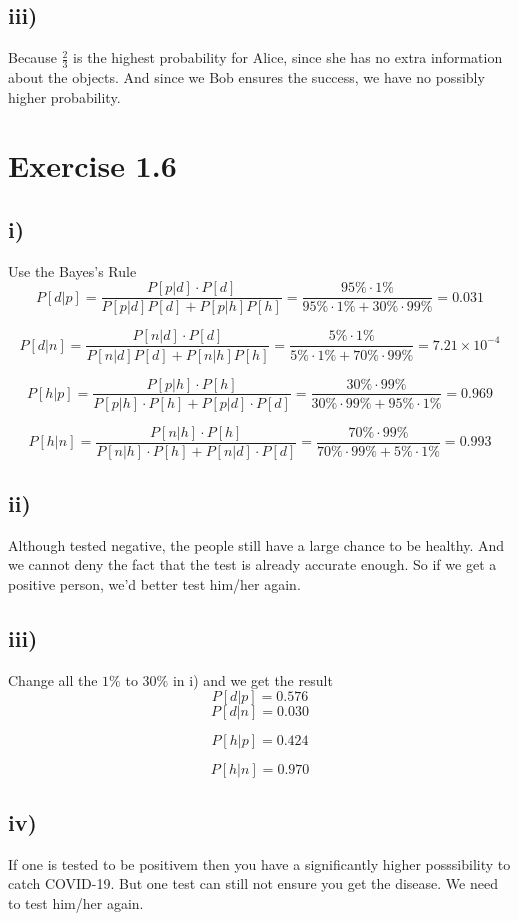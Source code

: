 \documentclass[12pt]{report}
\begin{document}
\subsection*{iii)}
Because $\frac{2}{3}$ is the highest probability for Alice, since she has no extra information about the objects. And since we Bob ensures the success, we have no possibly higher
probability.

\section*{Exercise 1.6}
\subsection*{i)}
Use the Bayes's Rule
$$
P[d|p] = \frac{P[p | d] \cdot P[d] }{P[p |d]P[d] + P[p | h]P[h]} = \frac{95\% \cdot 1\%}{95\% \cdot 1\% + 30\% \cdot 99\%} = 0.031
$$

$$
P[d|n] = \frac{P[n | d] \cdot P[d]}{P[n |d]P[d] + P[n | h]P[h]} = \frac{5\% \cdot 1\%}{5\%\cdot 1\% + 70\%\cdot 99\%} = 7.21 \times 10^{-4}
$$

$$
P[h|p] = \frac{P[p|h]\cdot P[h]}{P[p|h]\cdot P[h] + P[p|d]\cdot P[d]} = \frac{30\% \cdot 99\%}{30\% \cdot 99\% + 95\% \cdot 1\%} = 0.969
$$

$$
P[h|n] = \frac{P[n|h]\cdot P[h]}{P[n|h] \cdot P[h] + P[n|d]\cdot P[d]} = \frac{70\% \cdot 99\%}{70\% \cdot 99\% + 5\% \cdot 1\%} = 0.993
$$
\subsection*{ii)}
Although tested negative, the people still have a large chance to be healthy. And we cannot deny the fact that the test is already accurate enough.
So if we get a positive person, we'd better test him/her again.

\subsection*{iii)}
Change all the $1\%$ to $30\%$ in i) and we get the result
$$
    P[d|p] = 0.576
$$
$$
    P[d|n] = 0.030
$$

$$
    P[h|p] = 0.424
$$

$$
    P[h|n] = 0.970
$$

\subsection*{iv)}
If one is tested to be positivem then you have a significantly higher posssibility to catch COVID-19. But one test can still not ensure you get the disease.
We need to test him/her again.

\newpage
\printbibliography
\end{document}
